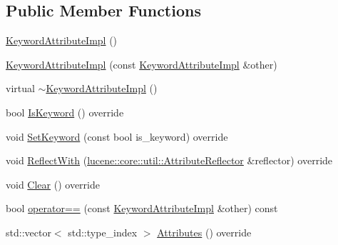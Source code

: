 \subsection*{Public Member Functions}
\begin{DoxyCompactItemize}
\item 
\mbox{\hyperlink{classlucene_1_1core_1_1analysis_1_1tokenattributes_1_1KeywordAttributeImpl_a1a92ef5f629fcca79c12a5009deb7941}{Keyword\+Attribute\+Impl}} ()
\item 
\mbox{\hyperlink{classlucene_1_1core_1_1analysis_1_1tokenattributes_1_1KeywordAttributeImpl_a8737063d5e2cb8ad21fdba8ec4ba210f}{Keyword\+Attribute\+Impl}} (const \mbox{\hyperlink{classlucene_1_1core_1_1analysis_1_1tokenattributes_1_1KeywordAttributeImpl}{Keyword\+Attribute\+Impl}} \&other)
\item 
virtual \mbox{\hyperlink{classlucene_1_1core_1_1analysis_1_1tokenattributes_1_1KeywordAttributeImpl_aab9c236453177ca4e9c3cb86d3e93fa6}{$\sim$\+Keyword\+Attribute\+Impl}} ()
\item 
bool \mbox{\hyperlink{classlucene_1_1core_1_1analysis_1_1tokenattributes_1_1KeywordAttributeImpl_aa98aa28fbea635057a71d0129cb92a2e}{Is\+Keyword}} () override
\item 
void \mbox{\hyperlink{classlucene_1_1core_1_1analysis_1_1tokenattributes_1_1KeywordAttributeImpl_a1cae85f0e103d3dfa054c1a42e119de2}{Set\+Keyword}} (const bool is\+\_\+keyword) override
\item 
void \mbox{\hyperlink{classlucene_1_1core_1_1analysis_1_1tokenattributes_1_1KeywordAttributeImpl_a610aab1880b02caf13fb7f1723c24c94}{Reflect\+With}} (\mbox{\hyperlink{namespacelucene_1_1core_1_1util_a7dbb701adaed055f73fb95eec83da10a}{lucene\+::core\+::util\+::\+Attribute\+Reflector}} \&reflector) override
\item 
void \mbox{\hyperlink{classlucene_1_1core_1_1analysis_1_1tokenattributes_1_1KeywordAttributeImpl_a019bfed2dce94170444db84c7575f43c}{Clear}} () override
\item 
bool \mbox{\hyperlink{classlucene_1_1core_1_1analysis_1_1tokenattributes_1_1KeywordAttributeImpl_a057cd81b19aa11973911473903ff84e3}{operator==}} (const \mbox{\hyperlink{classlucene_1_1core_1_1analysis_1_1tokenattributes_1_1KeywordAttributeImpl}{Keyword\+Attribute\+Impl}} \&other) const
\item 
std\+::vector$<$ std\+::type\+\_\+index $>$ \mbox{\hyperlink{classlucene_1_1core_1_1analysis_1_1tokenattributes_1_1KeywordAttributeImpl_af338dde5485b5feb1b467fc07534f5cc}{Attributes}} () override
\item 

\end{DoxyCompactItemize}
